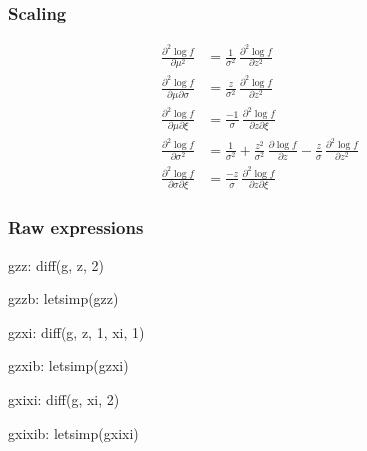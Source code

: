 \subsubsection*{Scaling}
{\color{red}
\begin{align*}
  \frac{\partial^2 \log f}{\partial \mu^2}
  &= \frac{1}{\sigma^2} \,
    \frac{\partial^2 \log f}{\partial z^2} \\
  \frac{\partial^2 \log f}{\partial \mu \partial \sigma}
  &= \frac{z}{\sigma^2} \,
    \frac{\partial^2 \log f}{\partial z^2} \\
  \frac{\partial^2 \log f}{\partial \mu \partial \xi}
  &= \frac{-1}{\sigma} \,
    \frac{\partial^2 \log f}{\partial z \partial \xi}\\
  \frac{\partial^2 \log f}{\partial \sigma^2}
  &= \frac{1}{\sigma^2} +
    \frac{z^2}{\sigma^2} \,\frac{\partial \log f}{\partial z}  -
    \frac{z}{\sigma} \,
    \frac{\partial^2 \log f}{\partial z^2}  \\
  \frac{\partial^2 \log f}{\partial \sigma \partial \xi}
  &= \frac{-z}{\sigma} \,
    \frac{\partial^2 \log f}{\partial z \partial \xi} 
\end{align*}
}

\subsubsection*{Raw expressions}
\begin{maxima}
  gzz: diff(g, z, 2)
\end{maxima}%

\begin{maxima}
  gzzb: letsimp(gzz)
\end{maxima}%

\begin{maxima}
  gzxi: diff(g, z, 1, xi, 1)
\end{maxima}%

\begin{maxima}
  gzxib: letsimp(gzxi)
\end{maxima}%

\begin{maxima}
  gxixi: diff(g, xi, 2)
\end{maxima}%

\begin{maxima}
  gxixib: letsimp(gxixi)
\end{maxima}%


